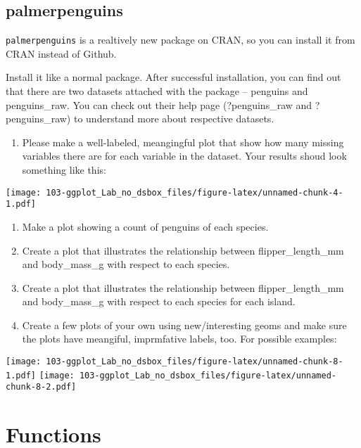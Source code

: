 \documentclass[
]{book}
\providecommand{\tightlist}{%
  \setlength{\itemsep}{0pt}\setlength{\parskip}{0pt}}
\begin{document}
\hypertarget{palmerpenguins}{%
\section{palmerpenguins}\label{palmerpenguins}}

\texttt{palmerpenguins} is a realtively new package on CRAN, so you can install it from CRAN instead of Github.

Install it like a normal package. After successful installation, you can find out that there are two datasets attached with the package -- penguins and penguins\_raw. You can check out their help page (?penguins\_raw and ?penguins\_raw) to understand more about respective datasets.

\begin{enumerate}
\def\labelenumi{\arabic{enumi}.}
\tightlist
\item
  Please make a well-labeled, meangingful plot that show how many missing variables there are for each variable in the dataset. Your results shoud look something like this:
\end{enumerate}

\texttt{[image: 103-ggplot\_Lab\_no\_dsbox\_files/figure-latex/unnamed-chunk-4-1.pdf]}

\begin{enumerate}
\def\labelenumi{\arabic{enumi}.}
\setcounter{enumi}{1}
\item
  Make a plot showing a count of penguins of each species.
\item
  Create a plot that illustrates the relationship between flipper\_length\_mm and body\_mass\_g with respect to each species.
\item
  Create a plot that illustrates the relationship between flipper\_length\_mm and body\_mass\_g with respect to each species for each island.
\item
  Create a few plots of your own using new/interesting geoms and make sure the plots have meangiful, imprmfative labels, too. For possible examples:
\end{enumerate}

\texttt{[image: 103-ggplot\_Lab\_no\_dsbox\_files/figure-latex/unnamed-chunk-8-1.pdf]} \texttt{[image: 103-ggplot\_Lab\_no\_dsbox\_files/figure-latex/unnamed-chunk-8-2.pdf]}

\hypertarget{functions}{%
\chapter{Functions}\label{functions}}
\end{document}
